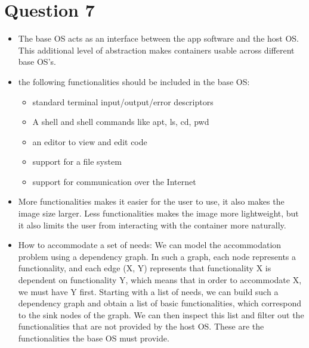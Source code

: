 \documentclass{article}
\begin{document}
\section{Question 7}
\begin{itemize}
\item The base OS acts as an interface between the app software and the host OS. This additional level of abstraction makes containers usable across different base OS's. 
\item the following functionalities should be included in the base OS:
    \begin{itemize}
    \item standard terminal input/output/error descriptors
    \item A shell and shell commands like apt, ls, cd, pwd
    \item an editor to view and edit code
    \item support for a file system
    \item support for communication over the Internet
    \end{itemize}
\item More functionalities makes it easier for the user to use, it also makes the image size larger. Less functionalities makes the image more lightweight, but it also limits the user from interacting with the container more naturally.
\item How to accommodate a set of needs:
    We can model the accommodation problem using a dependency graph. In such a graph, each node represents a functionality, and each edge (X, Y) represents that functionality X is dependent on functionality Y, which means that in order to accommodate X, we must have Y first. Starting with a list of needs, we can build such a dependency graph and obtain a list of basic functionalities, which correspond to the sink nodes of the graph. We can then inspect this list and filter out the functionalities that are not provided by the host OS. These are the functionalities the base OS must provide.
\end{itemize}
\end{document}

